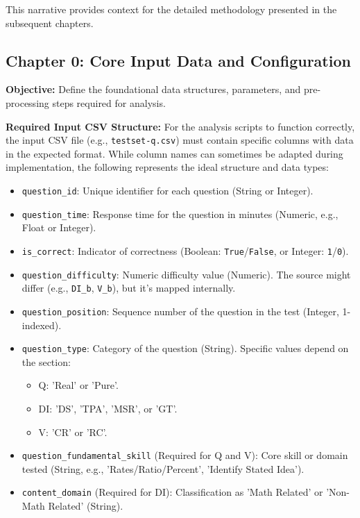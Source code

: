 \documentclass{article}
\begin{document}
This narrative provides context for the detailed methodology presented in the subsequent chapters.

\subsection{Chapter 0: Core Input Data and Configuration}

\textbf{Objective:} Define the foundational data structures, parameters, and pre-processing steps required for analysis.

\textbf{Required Input CSV Structure:}
For the analysis scripts to function correctly, the input CSV file (e.g., \texttt{testset-q.csv}) must contain specific columns with data in the expected format. While column names can sometimes be adapted during implementation, the following represents the ideal structure and data types:

\begin{itemize}
    \item \texttt{question\_id}: Unique identifier for each question (String or Integer).
    \item \texttt{question\_time}: Response time for the question in minutes (Numeric, e.g., Float or Integer).
    \item \texttt{is\_correct}: Indicator of correctness (Boolean: \texttt{True}/\texttt{False}, or Integer: \texttt{1}/\texttt{0}).
    \item \texttt{question\_difficulty}: Numeric difficulty value (Numeric). The source might differ (e.g., \texttt{DI\_b}, \texttt{V\_b}), but it's mapped internally.
    \item \texttt{question\_position}: Sequence number of the question in the test (Integer, 1-indexed).
    \item \texttt{question\_type}: Category of the question (String). Specific values depend on the section:
        \begin{itemize}
            \item Q: 'Real' or 'Pure'.
            \item DI: 'DS', 'TPA', 'MSR', or 'GT'.
            \item V: 'CR' or 'RC'.
        \end{itemize}
    \item \texttt{question\_fundamental\_skill} (Required for Q and V): Core skill or domain tested (String, e.g., 'Rates/Ratio/Percent', 'Identify Stated Idea').
    \item \texttt{content\_domain} (Required for DI): Classification as 'Math Related' or 'Non-Math Related' (String).
\end{itemize}
\end{document}

